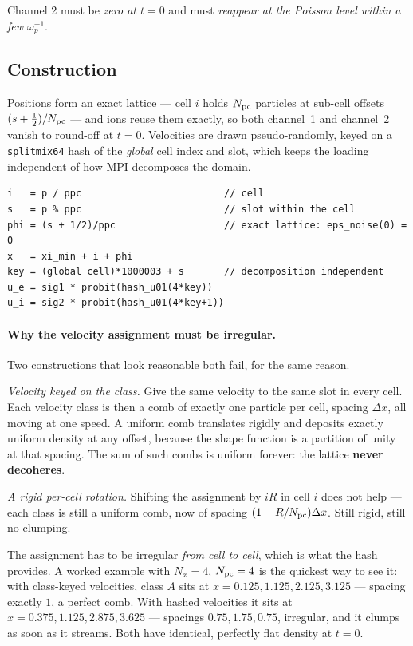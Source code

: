 \documentclass[11pt,a4paper]{article}
\newcommand{\code}[1]{\texttt{\small #1}}
\newcommand{\Npc}{N_{\rm pc}}
\begin{document}
Channel 2 must be \emph{zero at $t=0$} and must \emph{reappear at the Poisson level
within a few $\omega_p^{-1}$}.

\subsection{Construction}
\label{sec:quietconstr}

Positions form an exact lattice --- cell $i$ holds $\Npc$ particles at sub-cell
offsets $(s+\tfrac12)/\Npc$ --- and ions reuse them exactly, so both channel~1 and
channel~2 vanish to round-off at $t=0$. Velocities are drawn pseudo-randomly,
keyed on a \code{splitmix64} hash of the \emph{global} cell index and slot, which
keeps the loading independent of how MPI decomposes the domain.

\begin{lstlisting}
i   = p / ppc                         // cell
s   = p % ppc                         // slot within the cell
phi = (s + 1/2)/ppc                   // exact lattice: eps_noise(0) = 0
x   = xi_min + i + phi
key = (global cell)*1000003 + s       // decomposition independent
u_e = sig1 * probit(hash_u01(4*key))
u_i = sig2 * probit(hash_u01(4*key+1))
\end{lstlisting}

\paragraph{Why the velocity assignment must be irregular.} Two constructions that
look reasonable both fail, for the same reason.

\emph{Velocity keyed on the class.} Give the same velocity to the same slot in
every cell. Each velocity class is then a comb of exactly one particle per cell,
spacing $\Delta x$, all moving at one speed. A uniform comb translates rigidly and
deposits exactly uniform density at any offset, because the shape function is a
partition of unity at that spacing. The sum of such combs is uniform forever: the
lattice \textbf{never decoheres}.

\emph{A rigid per-cell rotation.} Shifting the assignment by $iR$ in cell $i$ does
not help --- each class is still a uniform comb, now of spacing
$(1-R/\Npc)\Delta x$. Still rigid, still no clumping.

The assignment has to be irregular \emph{from cell to cell}, which is what the hash
provides. A worked example with $N_x=4$, $\Npc=4$ is the quickest way to see it: with
class-keyed velocities, class $A$ sits at $x = 0.125, 1.125, 2.125, 3.125$ --- spacing
exactly $1$, a perfect comb. With hashed velocities it sits at
$x = 0.375, 1.125, 2.875, 3.625$ --- spacings $0.75, 1.75, 0.75$, irregular, and it
clumps as soon as it streams. Both have identical, perfectly flat density at $t=0$.
\end{document}
